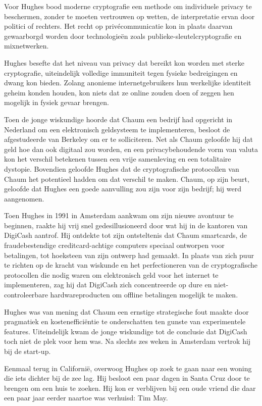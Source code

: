 \documentclass[
  a5paper,
  smalldemyvopaper,11pt,twoside,onecolumn,openright,extrafontsizes,
hidelinks]{memoir}
\begin{document}
Voor Hughes bood moderne cryptografie een methode om individuele privacy
te beschermen, zonder te moeten vertrouwen op wetten, de interpretatie
ervan door politici of rechters. Het recht op privécommunicatie kon in
plaats daarvan gewaarborgd worden door technologieën zoals
publieke-sleutelcryptografie en mixnetwerken.

Hughes besefte dat het niveau van privacy dat bereikt kon worden met
sterke cryptografie, uiteindelijk volledige immuniteit tegen fysieke
bedreigingen en dwang kon bieden. Zolang anonieme internetgebruikers hun
werkelijke identiteit geheim konden houden, kon niets dat ze online
zouden doen of zeggen hen mogelijk in fysiek gevaar brengen.

Toen de jonge wiskundige hoorde dat Chaum een bedrijf had opgericht in
Nederland om een elektronisch geldsysteem te implementeren, besloot de
afgestudeerde van Berkeley om er te solliciteren. Net als Chaum geloofde
hij dat geld hoe dan ook digitaal zou worden, en een privacybehoudende
vorm van valuta kon het verschil betekenen tussen een vrije samenleving
en een totalitaire dystopie. Bovendien geloofde Hughes dat de
cryptografische protocollen van Chaum het potentieel hadden om dat
verschil te maken. Chaum, op zijn beurt, geloofde dat Hughes een goede
aanvulling zou zijn voor zijn bedrijf; hij werd aangenomen.

Toen Hughes in 1991 in Amsterdam aankwam om zijn nieuwe avontuur te
beginnen, raakte hij vrij snel gedesillusioneerd door wat hij in de
kantoren van DigiCash aantrof. Hij ontdekte tot zijn ontsteltenis dat
Chaum smartcards, de fraudebestendige creditcard-achtige computers
speciaal ontworpen voor betalingen, tot hoeksteen van zijn ontwerp had
gemaakt. In plaats van zich puur te richten op de kracht van wiskunde en
het perfectioneren van de cryptografische protocollen die nodig waren om
elektronisch geld voor het internet te implementeren, zag hij dat
DigiCash zich concentreerde op dure en niet-controleerbare
hardwareproducten om offline betalingen mogelijk te maken.

Hughes was van mening dat Chaum een ernstige strategische fout maakte
door pragmatiek en kostenefficiëntie te onderschatten ten gunste van
experimentele features. Uiteindelijk kwam de jonge wiskundige tot de
conclusie dat DigiCash toch niet de plek voor hem was. Na slechts zes
weken in Amsterdam vertrok hij bij de start-up.

Eenmaal terug in Californië, overwoog Hughes op zoek te gaan naar een
woning die iets dichter bij de zee lag. Hij besloot een paar dagen in
Santa Cruz door te brengen om een huis te zoeken. Hij kon er verblijven
bij een oude vriend die daar een paar jaar eerder naartoe was verhuisd:
Tim May.
\end{document}
